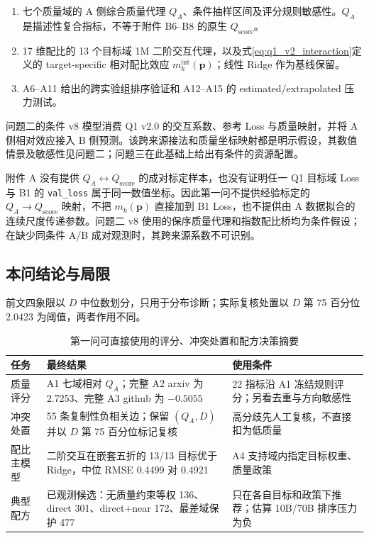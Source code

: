 \begin{enumerate}
  \item 七个质量域的 A 侧综合质量代理 $Q_A$、条件抽样区间及评分规则敏感性。$Q_A$ 是描述性复合指标，不等于附件 B6--B8 的原生 $Q_{\mathrm{score}}$。
  \item 17 维配比的 13 个目标域 1M 二阶交互代理，以及式\eqref{eq:q1_v2_interaction}定义的 target-specific 相对配比效应 $m_k^{\mathrm{int}}(\boldsymbol p)$；线性 Ridge 作为基线保留。
  \item A6--A11 给出的跨实验组排序验证和 A12--A15 的 estimated/extrapolated 压力测试。
\end{enumerate}

问题二的条件 v8 模型消费 Q1 v2.0 的交互系数、参考 Loss 与质量映射，并将 A 侧相对效应接入 B 侧预测。该跨来源接法和质量坐标映射都是明示假设，其数值情景及敏感性见问题二；问题三在此基础上给出有条件的资源配置。

附件 A 没有提供 $Q_A\leftrightarrow Q_{\mathrm{score}}$ 的成对标定样本，也没有证明任一 Q1 目标域 Loss 与 B1 的 \texttt{val\_loss} 属于同一数值坐标。因此第一问不提供经验标定的 $Q_A\to Q_{\mathrm{score}}$ 映射，不把 $m_k(\boldsymbol p)$ 直接加到 B1 Loss，也不提供由 A 数据拟合的连续尺度传递参数。问题二 v8 使用的保序质量代理和指数配比桥均为条件假设；在缺少同条件 A/B 成对观测时，其跨来源系数不可识别。

\subsection{本问结论与局限}

前文四象限以 $D$ 中位数划分，只用于分布诊断；实际复核处置以
$D$ 第 75 百分位 2.0423 为阈值，两者作用不同。

\begin{table}[htbp]\centering\small
\caption{第一问可直接使用的评分、冲突处置和配方决策摘要}
\label{tab:q1-decision-summary}
\begin{tabular}{p{}p{}p{}}\toprule
任务 & 最终结果 & 使用条件\\\midrule
质量评分 & A1 七域相对 $Q_A$；完整 A2 arxiv 为 2.7253、完整 A3 github 为 $-0.5055$ & 22 指标沿 A1 冻结规则评分；另看去重与方向敏感性\\
冲突处置 & 55 条复制性负相关边；保留 $(Q_A,D)$ 并以 $D$ 第 75 百分位标记复核 & 高分歧先人工复核，不直接扣为低质量\\
配比主模型 & 二阶交互在嵌套五折的 13/13 目标优于 Ridge，中位 RMSE 0.4499 对 0.4921 & A4 支持域内指定目标权重、质量政策\\
典型配方 & 已观测候选：无质量约束等权 136、direct 301、direct+near 172、最差域保护 477 & 只在各自目标和政策下推荐；估算 10B/70B 排序压力为负\\
\bottomrule\end{tabular}
\end{table}

